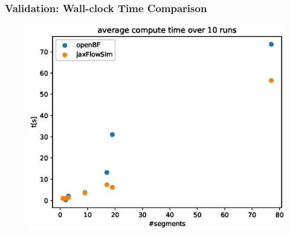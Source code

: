 \documentclass{beamer}
\begin{document}
\begin{frame}
	\frametitle{Validation: Wall-clock Time Comparison}
	\begin{figure} [H]
		\centering
		\includegraphics[width=0.94\columnwidth]{images/timing_benchmark.eps}
		\label{fig:comparison}
	\end{figure}

\end{frame}
\end{document}
